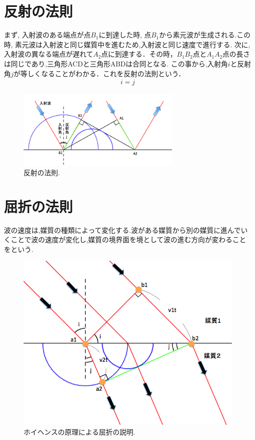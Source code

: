\section{反射の法則}
まず, 入射波のある端点が点$B_{1}$に到達した時, 点$B_{1}$から素元波が生成される.この時, 素元波は入射波と同じ媒質中を進むため,入射波と同じ速度で進行する. 次に, 入射波の異なる端点が遅れて$A_{2}$点に到達する．その時，$B_{1}B_{2}$点と$A_{1}A_{2}$点の長さは同じであり,三角形ACDと三角形ABDは合同となる. この事から,入射角$i$と反射角$j$が等しくなることがわかる．これを反射の法則という．
\begin{eqnarray}
\label{eq:refraction5}
i=j
\end{eqnarray}


\begin{figure}[htbp]
 \begin{center}
  \includegraphics[width=80mm]{../background/reflection1.png}
 \end{center}
 \caption{反射の法則.}
 \label{fig:backreflection}
\end{figure}

\section{屈折の法則}
波の速度は,媒質の種類によって変化する.波がある媒質から別の媒質に進んでいくことで波の速度が変化し,媒質の境界面を境として波の進む方向が変わることをという.

\begin{figure}[H]
 \begin{center}
  \includegraphics[width=120mm]{../background/backrefraction.png}
 \end{center}
 \caption{ホイヘンスの原理による屈折の説明.}
 \label{fig:backrefraction}
\end{figure}

